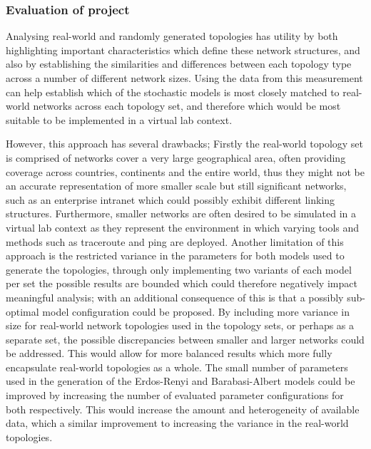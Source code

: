 \subsubsection{Evaluation of project}
Analysing real-world and randomly generated topologies has utility by both highlighting important characteristics which define these network structures, and also by establishing the similarities and differences between each topology type across a number of different network sizes. Using the data from this measurement can help establish which of the stochastic models is most closely matched to real-world networks across each topology set, and therefore which would be most suitable to be implemented in a virtual lab context. 

However, this approach has several drawbacks; Firstly the real-world topology set is comprised of networks cover a very large geographical area, often providing coverage across countries, continents and the entire world, thus they might not be an accurate representation of more smaller scale but still significant networks, such as an enterprise intranet which could possibly exhibit different linking structures. Furthermore, smaller networks are often desired to be simulated in a virtual lab context as they represent the environment in which varying tools and methods such as traceroute \cite{jacobson1989traceroute} and ping are deployed. Another limitation of this approach is the restricted variance in the parameters for both models used to generate the topologies, through only implementing two variants of each model per set the possible results are bounded which could therefore negatively impact meaningful analysis; with an additional consequence of this is that a possibly sub-optimal model configuration could be proposed. By including more variance in size for real-world network topologies used in the topology sets, or perhaps as a separate set, the possible discrepancies between smaller and larger networks could be addressed. This would allow for more balanced results which more fully encapsulate real-world topologies as a whole. The small number of parameters used in the generation of the Erdos-Renyi and Barabasi-Albert models could be improved by increasing the number of evaluated parameter configurations for both respectively. This would increase the amount and heterogeneity of available data, which a similar improvement to increasing the variance in the real-world topologies. 

